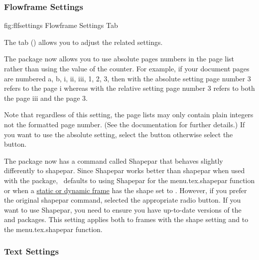 \subsubsection{Flowframe Settings}\label{sec:texconfigflf}


\FloatFig
 {fig:flfsettings}
 {}
 {Flowframe Settings Tab}

The  tab
() allows you to adjust the
 related settings.


The  package now allows you to use absolute pages
numbers in the page list rather than using the value of the
 counter. For example, if your document pages are numbered
a, b, i, ii, iii, 1, 2, 3, then with the absolute setting page
number 3 refers to the page  i whereas with the
relative setting page number 3 refers to both the page
 iii and the page  3.

Note that regardless of this setting, the page lists may only
contain plain integers not the formatted page number.
(See the  documentation for further details.) If you want to
use the absolute setting, select the
 button otherwise select the
 button.


The  package now has a command called
\gls{Shapepar} that behaves slightly differently to
\gls{shapepar}. Since \gls{Shapepar} works better than
\gls{shapepar} when used with the  package,
\FlowframTk\ defaults to using \gls{Shapepar} for the
\gls{menu.tex.shapepar} function or when a
\hyperref[sec:flowframe]{static or dynamic frame} has the
shape set to . However, if
you prefer the original \gls{shapepar} command, selected the
appropriate  radio button.
If you want to use \gls{Shapepar}, you need to ensure you have
up-to-date versions of the  and 
packages. This setting applies both to frames with the
 shape setting and to the
\gls{menu.tex.shapepar} function.

\subsubsection{Text Settings}\label{sec:texconfigtext}

